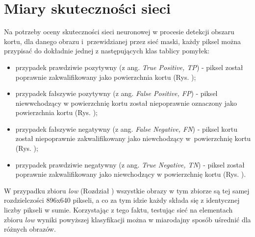 \section{Miary skuteczności sieci}

Na potrzeby oceny skuteczności sieci neuronowej w procesie detekcji obszaru kortu, dla danego obrazu i~przewidzianej przez sieć maski, każdy piksel można przypisać do dokładnie jednej z następujących klas tablicy pomyłek:

\begin{itemize}
  \item przypadek prawdziwie pozytywny (z ang. \textit{True Positive, TP}) - piksel został poprawnie zakwalifikowany jako powierzchnia kortu (Rys. );
  \item przypadek fałszywie pozytywny (z ang. \textit{False Positive, FP}) - piksel niewwchodzący w powierzchnię kortu został niepoprawnie oznaczony jako powierzchnia kortu (Rys. );
  \item przypadek fałszywie negatywny (z ang. \textit{False Negative, FN}) - piksel kortu został niepoprawnie zakwalifikowany jako niewchodzący w~powierzchnię kortu (Rys. );
  \item przypadek prawdziwie negatywny (z ang. \textit{True Negative, TN}) - piksel został poprawnie zakwalifikowany jako niewchodzący w powierzchnię kortu (Rys. ).
\end{itemize}

W przypadku zbioru \textit{low} (Rozdział ) wszystkie obrazy w tym zbiorze są tej samej rozdzielczości 896x640 pikseli, a co za tym idzie każdy składa się z identycznej liczby pikseli w sumie.
Korzystając z tego faktu, testując sieć na elementach zbioru \textit{low} wyniki powyższej klasyfikacji można w miarodajny sposób uśrednić dla różnych obrazów.

